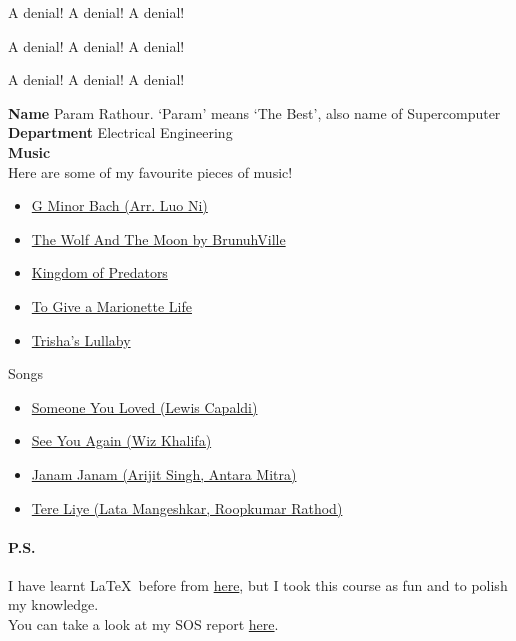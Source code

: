 \documentclass[letterpaper]{article}
\begin{document}
\begin{center}
	{\sc 
	\large{A denial! A denial! A denial!}

	\vspace{1em}

	\LARGE{A denial! A denial! A denial!}

	\vspace{1em}

	\huge{A denial! A denial! A denial!}}
\end{center}
\newpage
\textbf{Name} Param Rathour. `Param' means `The Best', also name of Supercomputer\\[5pt]
\textbf{Department} Electrical Engineering\\[5pt]
\textbf{Music} \\[5pt]Here are some of my favourite pieces of music!
\begin{itemize}
	\item \href{https://youtu.be/o-ONVkhJVSA}{G Minor Bach (Arr. Luo Ni)}
	\item \href{https://youtu.be/HEf_xrgmuRI}{The Wolf And The Moon by BrunuhVille} 
	\item \href{https://youtu.be/q43wzP6A1CM?list=PL_oWkLvcB4HP1U_mOahMiEqRRKntuRI6Z}{Kingdom of Predators} 
	\item \href{https://youtu.be/Z4R42NALDy8?list=PL_oWkLvcB4HP1U_mOahMiEqRRKntuRI6Z}{To Give a Marionette Life} 
	\item \href{https://youtu.be/l2kwie-gs2o}{Trisha's Lullaby} 
\end{itemize}
Songs
\begin{itemize}
\item \href{https://youtu.be/zABLecsR5UE}{Someone You Loved (Lewis Capaldi)}
\item \href{https://youtu.be/RgKAFK5djSk}{See You Again (Wiz Khalifa)}
\item \href{https://youtu.be/pIBoAh4OXhQ}{Janam Janam (Arijit Singh, Antara Mitra)}
\item \href{https://youtu.be/jo6iAkSoraY}{Tere Liye (Lata Mangeshkar, Roopkumar Rathod)}
\end{itemize}
\paragraph{P.S.} I have learnt \LaTeX\ before from \href{https://www.latex-tutorial.com/tutorials/}{here}, but I took this course as fun and to polish my knowledge.\\
You can take a look at my SOS report \href{https://github.com/paramrathour/Nonlinear-Dynamics/blob/master/Nonlinear%20Dynamics.pdf}{here}.
\end{document}
